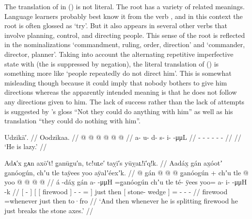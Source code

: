 The translation of  in (\lastx) is not literal.
The root  has a variety of related meanings.
Language learners probably best know it from the verb , and in this context the root is often glossed as ‘try’.
But it also appears in several other verbs that involve planning, control, and directing people.
This sense of the root is reflected in the nominalizations  ‘commandment, ruling, order, direction’ and  ‘commander, director, planner’.
Taking into account the alternating repetitive imperfective state with  (the  is suppressed by negation), the literal translation of (\lastx) is something more like ‘people repeatedly do not direct him’.
This is somewhat misleading though because it could imply that nobody bothers to give him directions whereas the apparently intended meaning is that he does not follow any directions given to him.
The lack of success rather than the lack of attempts is suggested by \citeauthor{swanton:1909}’s gloss “Not they could do anything with him” as well as his translation “they could do nothing with him”.

\ex\label{ex:106-20-lazy}%
%
\begingl
	\glpreamble	Udzikā′. //
	\glpreamble	Oodzikaa. //
	\gla	{} @ {} @ {} @ {} @ {} @ {} @ {} //
	\glb	a- u- d- s- i-  -μμL //
	\glc	{}- - - - -  - //
	\gld	{} {} {} {} {} {} {} //
	\glft	‘He is lazy.’
		//
\endgl
\xe

\ex\label{ex:106-21-break-axe}%
%
\begingl
	\glpreamble	Adᴀ′x gᴀn axō′t! g̣anūgu′n, tc!uʟe′ taỵī′s yūỵaʟ!ī′q!k. //
	\glpreamble	Aadáx̱ gán ax̱óotʼ g̱anóogún, chʼu tle taÿees yoo aÿalʼéexʼk. //
	\gla	{}  @ {} {}
			{} {} gán {}
			 @ {} @ {} @ \•g̱anóogún {} +
			chʼu tle {}  @ {} {}
			yoo @  @ {} @ {} @ {} //
	\glb	{} á -dáx̱ {}
			{} {} gán {}
			a-  -μμH =g̱anóogún {}
			chʼu tle {} té- ÿees {}
			yoo= a- i-  -μμH -k //
	\glc	{}[  - {}]
			{}[ {}[ firewood {}]
			-  - = {}]
			just then {}[ stone- wedge {}]
			= - -  - //
	\gld	{}  {} {}
			{} {} firewood {}
			 {} {} =whenever {}
			just then {}  {} {}
			to·fro  {} {} {} //
	\glft	‘And then whenever he is splitting firewood he just breaks the stone axes.’
		//
\endgl
\xe

